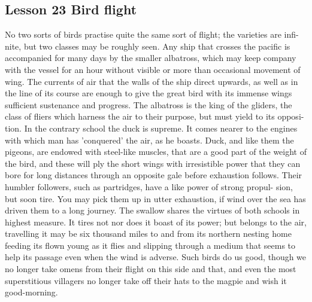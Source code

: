 \documentclass[kindlepaper]{BHCexam4kindle}
\begin{document}
\subsection{Lesson 23
Bird flight}
\par
No two sorts of birds practise quite the same sort of flight; the varieties are infi-
nite, but two classes may be roughly seen. Any ship that crosses the pacific is
accompanied for many days by the smaller albatross, which may keep company
with the vessel for an hour without visible or more than occasional movement of
wing. The currents of air that the walls of the ship direct upwards, as well as in
the line of its course are enough to give the great bird with its immense wings
sufficient sustenance and progress. The albatross is the king of the gliders, the
class of fliers which harness the air to their purpose, but must yield to its opposi-
tion. In the contrary school the duck is supreme. It comes nearer to the engines
with which man has 'conquered' the air, as he boasts. Duck, and like them the
pigeons, are endowed with steel-like muscles, that are a good part of the weight
of the bird, and these will ply the short wings with irresistible power that they
can bore for long distances through an opposite gale before exhaustion follows.
Their humbler followers, such as partridges, have a like power of strong propul-
sion, but soon tire. You may pick them up in utter exhaustion, if wind over the
sea has driven them to a long journey. The swallow shares the virtues of both
schools in highest measure. It tires not nor does it boast of its power; but belongs
to the air, travelling it may be six thousand miles to and from its northern nesting
home feeding its flown young as it flies and slipping through a medium that
seems to help its passage even when the wind is adverse. Such birds do us good,
though we no longer take omens from their flight on this side and that, and even
the most superstitious villagers no longer take off their hats to the magpie and
wish it good-morning.
\clearpage
\end{document}

